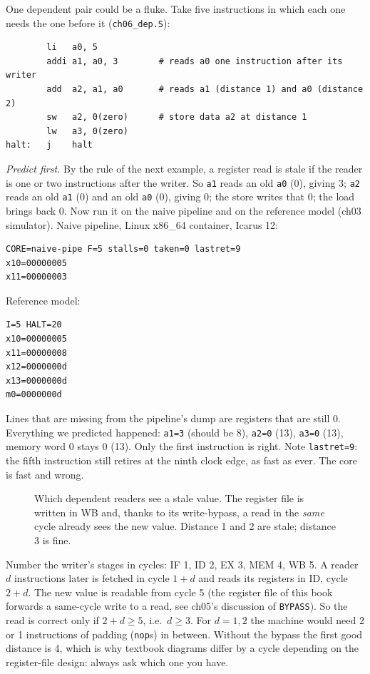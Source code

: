 \begin{example}\label{ex:chain06}
One dependent pair could be a fluke. Take five instructions in which
each one needs the one before it (\texttt{ch06\_dep.S}):
\begin{lstlisting}
        li   a0, 5
        addi a1, a0, 3        # reads a0 one instruction after its writer
        add  a2, a1, a0       # reads a1 (distance 1) and a0 (distance 2)
        sw   a2, 0(zero)      # store data a2 at distance 1
        lw   a3, 0(zero)
halt:   j    halt
\end{lstlisting}
\emph{Predict first.} By the rule of the next example, a register read
is stale if the reader is one or two instructions after the writer.
So \texttt{a1} reads an old \texttt{a0} (0), giving 3; \texttt{a2} reads
an old \texttt{a1} (0) and an old \texttt{a0} (0), giving 0; the store
writes that 0; the load brings back 0. Now run it on the naive
pipeline and on the reference model (ch03 simulator). Naive
pipeline, Linux x86\_64 container, Icarus 12:
\begin{lstlisting}
CORE=naive-pipe F=5 stalls=0 taken=0 lastret=9
x10=00000005
x11=00000003
\end{lstlisting}
Reference model:
\begin{lstlisting}
I=5 HALT=20
x10=00000005
x11=00000008
x12=0000000d
x13=0000000d
m0=0000000d
\end{lstlisting}
Lines that are missing from the pipeline's dump are registers that
are still 0. Everything we predicted happened: \texttt{a1=3} (should
be 8), \texttt{a2=0} (13), \texttt{a3=0} (13), memory word 0 stays 0
(13). Only the first instruction is right. Note \texttt{lastret=9}: the
fifth instruction still retires at the ninth clock edge, as fast
as ever. The core is fast and wrong.
\end{example}

\begin{figure}[t]
\centering

\caption[Dependence distance]{Which dependent readers see a stale
value. The register file is written in WB and, thanks to its
write-bypass, a read in the \emph{same} cycle already sees the new
value. Distance 1 and 2 are stale; distance 3 is fine.}
\label{fig:distance06}
\end{figure}

\begin{example}\label{ex:dist06}
Number the writer's stages in cycles: IF 1, ID 2, EX 3, MEM 4, WB 5. A
reader $d$ instructions later is fetched in cycle $1+d$ and reads its
registers in ID, cycle $2+d$. The new value is readable from cycle 5
(the register file of this book forwards a same-cycle write to a read,
see ch05's discussion of \texttt{BYPASS}). So the read is correct only
if $2+d\ge5$, i.e.\ $d\ge3$. For $d=1,2$ the machine would need 2 or
1 instructions of padding (\texttt{nop}s) in between. Without the
bypass the first good distance is 4, which is why textbook diagrams
differ by a cycle depending on the register-file design: always ask
which one you have.
\end{example}

